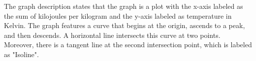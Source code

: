 The graph description states that the graph is a plot with the x-axis labeled as the sum of kilojoules per kilogram and the y-axis labeled as temperature in Kelvin. The graph features a curve that begins at the origin, ascends to a peak, and then descends. A horizontal line intersects this curve at two points. Moreover, there is a tangent line at the second intersection point, which is labeled as "Isoline".
